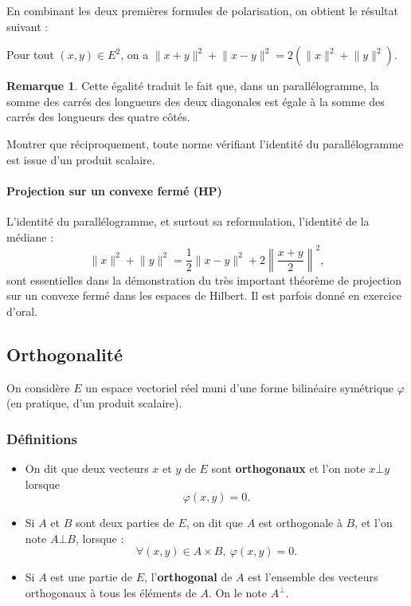 \documentclass[french]{article}
\theoremstyle{plain}
\theoremstyle{definition}
\newtheorem*{rmq}{Remarque}
\theoremstyle{remark}
\begin{document}
En combinant les deux premières formules de polarisation, on obtient le résultat suivant : 

\begin{prop}
	Pour tout $(x,y)\in E^2$, on a $\lVert x+y\rVert^2+\lVert x-y\rVert^2=2(\lVert x\rVert^2+\lVert y\rVert^2)$.
\end{prop}

\begin{rmq}
	Cette égalité traduit le fait que, dans un parallélogramme, la somme des carrés des longueurs des deux diagonales est égale à la somme des carrés des longueurs des quatre côtés.
\end{rmq}

\begin{exo}[$\star$]
	Montrer que réciproquement, toute norme vérifiant l'identité du parallélogramme est issue d'un produit scalaire.
\end{exo}

\paragraph{Projection sur un convexe fermé (HP)} L'identité du parallélogramme, et surtout sa reformulation, l'identité de la médiane : $$\lVert x\rVert^2+\lVert y\rVert^2=\frac{1}{2}\lVert x-y\rVert^2+2\left\lVert\frac{x+y}{2}\right\rVert^2,$$ sont essentielles dans la démonstration du très important théorème de projection sur un convexe fermé dans les espaces de Hilbert. Il est parfois donné en exercice d'oral.

\subsection{Orthogonalité}
On considère $E$ un espace vectoriel réel muni d'une forme bilinéaire symétrique $\varphi$ (en pratique, d'un produit scalaire).
\subsubsection*{Définitions}

\begin{dfn}
	\begin{itemize}
		\item On dit que deux vecteurs $x$ et $y$ de $E$ sont \textbf{orthogonaux} et l'on note $x\bot y$ lorsque $$\varphi(x,y)=0.$$
		\item Si $A$ et $B$ sont deux parties de $E$, on dit que $A$ est orthogonale à $B$, et l'on note $A\bot B$, lorsque : $$\forall (x,y)\in A\times B,\ \varphi(x,y)=0.$$
		\item Si $A$ est une partie de $E$, l'\textbf{orthogonal} de $A$ est l'ensemble des vecteurs orthogonaux à tous les éléments de $A$. On le note $A^\bot$.
	\end{itemize}
\end{dfn}
\end{document}
